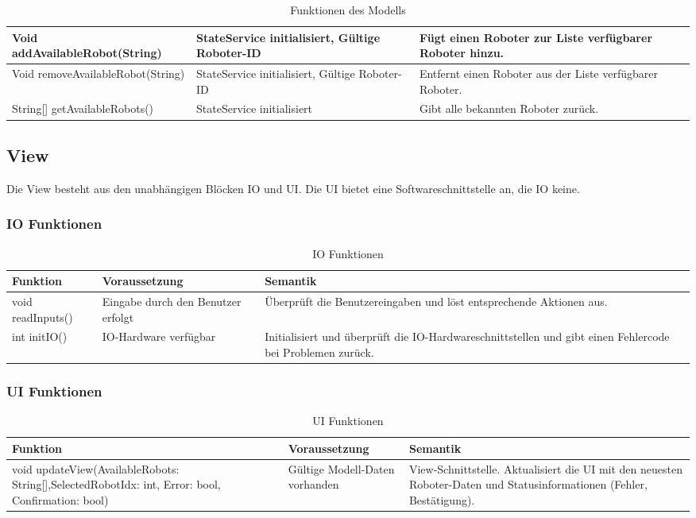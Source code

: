 \begin{table}[h!]
\begin{tabular}{|p{5cm}|p{5cm}|p{5cm}|}
        \hline
        Void addAvailableRobot(String) & StateService initialisiert, Gültige Roboter-ID & Fügt einen Roboter zur Liste verfügbarer Roboter hinzu. \\
        \hline
        Void removeAvailableRobot(String) & StateService initialisiert, Gültige Roboter-ID & Entfernt einen Roboter aus der Liste verfügbarer Roboter. \\
        \hline
        String[] getAvailableRobots() & StateService initialisiert & Gibt alle bekannten Roboter zurück. \\
        \hline
    \end{tabular}
    \caption{Funktionen des Modells}
    \label{tab:Methodenbeschreibung}
\end{table}

\clearpage
\subsection{View}
Die View besteht aus den unabhängigen Blöcken IO und UI. Die UI bietet eine Softwareschnittstelle an, die IO keine.

\subsubsection{IO Funktionen}
\begin{table}[h!]
    \centering
    \begin{tabular}{|p{5cm}|p{5cm}|p{5cm}|}
        \hline
        \textbf{Funktion} & \textbf{Voraussetzung} & \textbf{Semantik} \\
        \hline
        void readInputs() & Eingabe durch den Benutzer erfolgt & Überprüft die Benutzereingaben und löst entsprechende Aktionen aus. \\
        \hline
        int initIO() & IO-Hardware verfügbar & Initialisiert und überprüft die IO-Hardwareschnittstellen und gibt einen Fehlercode bei Problemen zurück. \\
        \hline
    \end{tabular}
    \caption{IO Funktionen}
    \label{tab:IOFunktionen}
\end{table}

\subsubsection{UI Funktionen}
\begin{table}[h!]
    \centering
    \begin{tabular}{|p{5cm}|p{5cm}|p{5cm}|}
        \hline
        \textbf{Funktion} & \textbf{Voraussetzung} & \textbf{Semantik} \\
        \hline
        void updateView(AvailableRobots: String[],SelectedRobotIdx: int, Error: bool, Confirmation: bool) & Gültige Modell-Daten vorhanden & View-Schnittstelle. Aktualisiert die UI mit den neuesten Roboter-Daten und Statusinformationen (Fehler, Bestätigung). \\ 
        \hline
    \end{tabular}
    \caption{UI Funktionen}
    \label{tab:UIFunktionen}
\end{table}


